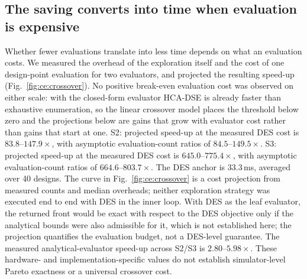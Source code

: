 \documentclass[pdflatex,sn-nature,lineno]{sn-jnl}
\newcommand{\DesCostMs}{33.3}
\newcommand{\RefCrossoverFig}{Fig.~\ref{fig:ce:crossover}}
\begin{document}
\subsection{The saving converts into time when evaluation is expensive}
Whether fewer evaluations translate into less time depends on what an evaluation costs.
We measured the overhead of the exploration itself and the cost of one design-point
evaluation for two evaluators, and projected the resulting speed-up
(Fig.~\ref{fig:ce:crossover}).
%
No positive break-even evaluation cost was observed on either scale: with the closed-form evaluator HCA-DSE is already faster than exhaustive enumeration, so the linear crossover model places the threshold below zero and the projections below are gains that grow with evaluator cost rather than gains that start at one.
S2: projected speed-up at the measured DES cost is $83.8\text{--}147.9\times$, with asymptotic evaluation-count ratios of $84.5\text{--}149.5\times$.
S3: projected speed-up at the measured DES cost is $645.0\text{--}775.4\times$, with asymptotic evaluation-count ratios of $664.6\text{--}803.7\times$. The DES anchor is $\DesCostMs$\,ms, averaged over 40 designs. The curve in
\RefCrossoverFig{} is a cost projection from measured counts and median overheads;
neither exploration strategy was executed end to end with DES in the inner loop. With DES as the leaf evaluator, the returned front would be exact with respect to the DES objective only if the analytical bounds were also admissible for it, which is not established here; the projection quantifies the evaluation budget, not a DES-level guarantee.
The measured analytical-evaluator speed-up across S2/S3 is $2.80\text{--}5.98\times$. These hardware- and implementation-specific values do not establish
simulator-level Pareto exactness or a universal crossover cost.
\end{document}
